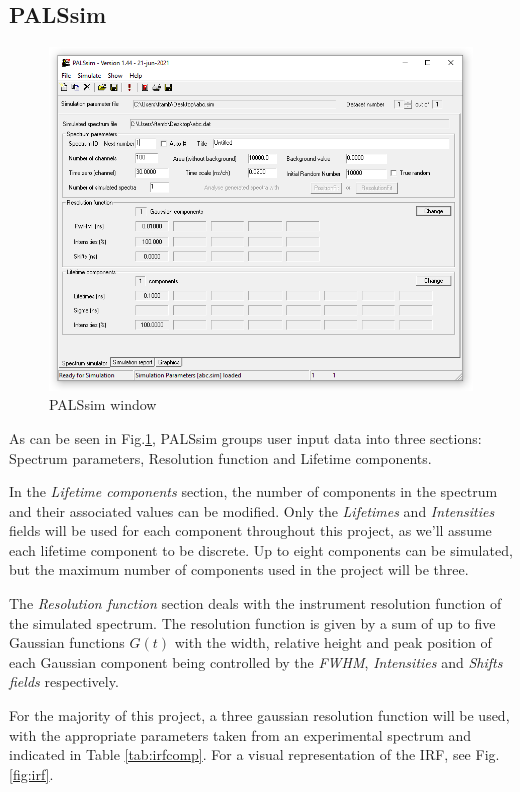 \subsection{PALSsim}
\begin{figure}
     
    \includegraphics[width=0.8\linewidth]{PALSsim.PNG}
    \caption{PALSsim window}
    \label{fig:Psim}
\end{figure}

As can be seen in Fig.\ref{fig:Psim}, PALSsim groups user input data into three sections: Spectrum parameters, Resolution function and Lifetime components.

In the \textit{Lifetime components} section, the number of components in the spectrum and their associated values can be modified. Only the \textit{Lifetimes} and \textit{Intensities} fields will be used for each component throughout this project, as we'll assume each lifetime component to be discrete. Up to eight components can be simulated, but the maximum number of components used in the project will be three.

The \textit{Resolution function} section deals with the instrument resolution function of the simulated spectrum. The resolution function is given by a sum of up to five Gaussian functions $G(t)$ with the width, relative height and peak position of each Gaussian component being controlled by the \textit{FWHM}, \textit{Intensities} and \textit{Shifts fields} respectively.

For the majority of this project, a three gaussian resolution function will be used, with the appropriate parameters taken from an experimental spectrum and indicated in Table \ref{tab:irfcomp}. For a visual representation of the IRF, see Fig. \ref{fig:irf}.

